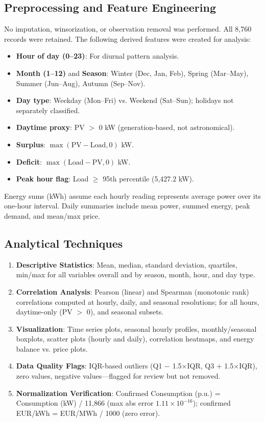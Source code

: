 \documentclass[conference]{IEEEtran}
\begin{document}
\subsection{Preprocessing and Feature Engineering}
\label{sec:preprocessing}

No imputation, winsorization, or observation removal was performed. All 8,760 records were retained. The following derived features were created for analysis:

\begin{itemize}
    \item \textbf{Hour of day (0–23)}: For diurnal pattern analysis.
    \item \textbf{Month (1–12)} and \textbf{Season}: Winter (Dec, Jan, Feb), Spring (Mar–May), Summer (Jun–Aug), Autumn (Sep–Nov).
    \item \textbf{Day type}: Weekday (Mon–Fri) vs. Weekend (Sat–Sun); holidays not separately classified.
    \item \textbf{Daytime proxy}: PV $>$ 0 kW (generation-based, not astronomical).
    \item \textbf{Surplus}: $\max(\text{PV} - \text{Load}, 0)$ kW.
    \item \textbf{Deficit}: $\max(\text{Load} - \text{PV}, 0)$ kW.
    \item \textbf{Peak hour flag}: Load $\ge$ 95th percentile (5,427.2 kW).
\end{itemize}

Energy sums (kWh) assume each hourly reading represents average power over its one-hour interval. Daily summaries include mean power, summed energy, peak demand, and mean/max price.

\subsection{Analytical Techniques}
\label{sec:techniques}

\begin{enumerate}
    \item \textbf{Descriptive Statistics}: Mean, median, standard deviation, quartiles, min/max for all variables overall and by season, month, hour, and day type.
    \item \textbf{Correlation Analysis}: Pearson (linear) and Spearman (monotonic rank) correlations computed at hourly, daily, and seasonal resolutions; for all hours, daytime-only (PV $>$ 0), and seasonal subsets.
    \item \textbf{Visualization}: Time series plots, seasonal hourly profiles, monthly/seasonal boxplots, scatter plots (hourly and daily), correlation heatmaps, and energy balance vs. price plots.
    \item \textbf{Data Quality Flags}: IQR-based outliers (Q1 $-$ 1.5$\times$IQR, Q3 $+$ 1.5$\times$IQR), zero values, negative values—flagged for review but not removed.
    \item \textbf{Normalization Verification}: Confirmed Consumption (p.u.) = Consumption (kW) / 11,866 (max abs error $1.11\times10^{-16}$); confirmed EUR/kWh = EUR/MWh / 1000 (zero error).
\end{enumerate}
\end{document}
